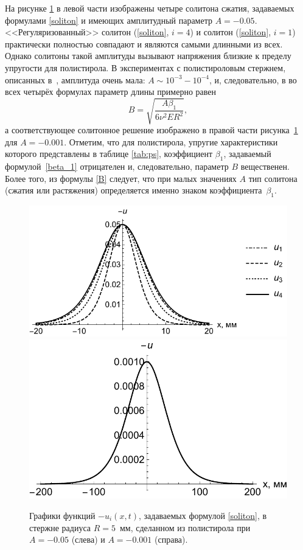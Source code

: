 \documentclass[12pt, a4paper]{article}
\begin{document}
На рисунке \ref{fig:soliton} в левой части изображены четыре солитона сжатия, задаваемых формулами \eqref{soliton} и имеющих амплитудный параметр $A = -0.05$.  <<Регуляризованный>> солитон (\ref{soliton}, $i=4$) и солитон (\ref{soliton}, $i=1$) практически полностью совпадают и являются самыми длинными из всех.
Однако солитоны такой амплитуды вызывают напряжения близкие к пределу упругости для полистирола. В экспериментах с полистироловым стержнем, описанных в~\cite{JAP2010,JAP2012}, амплитуда очень мала: $A \sim 10^{-3} - 10^{-4}$, и, следовательно, в во всех четырёх формулах параметр длины примерно равен
\begin{equation}\label{B}
B = \sqrt{\frac{A\beta_1}{6\nu^2 E R^2}},
\end{equation}
а соответствующее солитонное решение изображено в правой части рисунка~\ref{fig:soliton} для $A = -0.001$.
Отметим, что для полистирола, упругие характеристики которого представлены в таблице \ref{tab:ps}, коэффициент $\beta_1$, задаваемый формулой~\eqref{beta_1} отрицателен и, следовательно, параметр $B$ вещественен. Более того, из формулы \eqref{B} следует, что при малых значениях $A$ тип солитона (сжатия или растяжения) определяется именно знаком коэффициента~$\beta_1$.
\begin{figure}[h]
	\centering
	\vspace{-9mm}
	\includegraphics[width=0.54\linewidth]{3a_FourSolitonsBlack}
	\includegraphics[width=0.42\linewidth]{3b_SingleSoliton}
	\caption{Графики функций $-u_i(x,t)$, задаваемых формулой \eqref{soliton}, в стержне радиуса $R = 5$~мм, сделанном из полистирола при $A = -0.05$ (слева) и $A= -0.001$ (справа).}
	\label{fig:soliton}
	\vspace{-3mm}
\end{figure}
\end{document}

